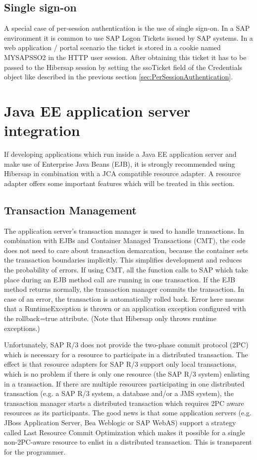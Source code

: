 \subsection{Single sign-on}
\label{sec:SingleSignOn}

A special case of per-session authentication is the use of single sign-on. In a SAP environment it is common to use SAP Logon Tickets issued by SAP systems. In a web application / portal scenario the ticket is stored in a cookie named MYSAPSSO2 in the HTTP user session. After obtaining this ticket it has to be passed to the Hibersap session by setting the ssoTicket field of the Credentials object like described in the previous section \ref{sec:PerSessionAuthentication}.

\section{Java EE application server integration}
\label{sec:JavaEEIntegration}
If developing applications which run inside a Java EE application server and make use of Enterprise Java Beans (EJB), it is 
strongly recommended using Hibersap in combination with a JCA compatible resource adapter. A resource adapter offers some important features which will be treated in this section.

\subsection{Transaction Management} 
The application server's transaction manager is used to handle transactions. In combination with EJBs and Container Managed Transactions (CMT), the code does not need to care about transaction demarcation, because the container sets the transaction boundaries implicitly. This simplifies development and reduces the probability of errors. If using CMT, all the 
function calls to SAP which take place during an EJB method call are running in one transaction. If the EJB method returns 
normally, the transaction manager commits the transaction. In case of an error, the transaction is automatically 
rolled back. Error here means that a RuntimeException is thrown or an application exception configured with the 
rollback=true attribute. (Note that Hibersap only throws runtime exceptions.)

Unfortunately, SAP R/3 does not provide the two-phase commit protocol (2PC) which is necessary for a resource to participate in a distributed transaction. The effect is that resource adapters for SAP R/3 support only local transactions, which is no problem if there is only one resource (the SAP R/3 system) enlisting in a transaction. If there are multiple resources participating in one distributed transaction (e.g. a SAP R/3 system, a database and/or a JMS system), the transaction manager starts a distributed transaction which requires 2PC aware resources as its participants. The good news is that some application servers (e.g. JBoss Application Server, Bea Weblogic or SAP WebAS) support a strategy called Last Resource Commit Optimization which makes it possible for a single non-2PC-aware resource to enlist in a distributed transaction. This is transparent for the programmer.

